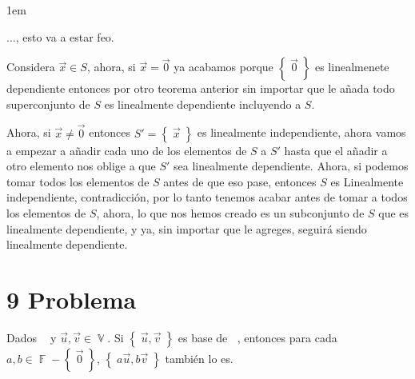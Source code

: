 \documentclass[12pt, fleqn]{article}                             %
\newenvironment{SmallIndentation}[1][0.75em]                    %
        {\begin{adjustwidth}{#1}{}\begin{footnotesize}}             %
        {\end{footnotesize}\end{adjustwidth}}                       %
\theoremstyle{break}                                            %
\DeclareMathOperator \GenericField {\mathbb{F}}                 %
\DeclareMathOperator \VectorSet    {\mathbb{V}}                 %
\DeclareMathOperator \VectorSpace  {\VectorSet_{\GenericField}} %
\newcommand{\Set}[1]    {\left\{ \; #1 \; \right\}}             %
\begin{document}
\begin{itemize}
\begin{SmallIndentation}[1em]
                $\dots$, esto va a estar feo.

                Considera $\vec x \in S$, ahora, si $\vec x = \vec 0$ ya acabamos porque $\Set{\vec 0}$ es linealmenete dependiente
                entonces por otro teorema anterior sin importar que le añada todo superconjunto de $S$ es linealmente dependiente
                incluyendo a $S$.

                Ahora, si $\vec x \neq \vec 0$ entonces $S' = \Set{\vec x}$ es linealmente independiente, ahora vamos a empezar
                a añadir cada uno de los elementos de $S$ a $S'$ hasta que el añadir a otro elemento nos oblige a que $S'$ 
                sea linealmente dependiente. Ahora, si podemos tomar todos los elementos de $S$ antes de que eso pase, entonces
                $S$ es Linealmente independiente, contradicción, por lo tanto tenemos acabar antes de tomar a todos los elementos
                de $S$, ahora, lo que nos hemos creado es un subconjunto de $S$ que es linealmente dependiente, y ya, sin importar
                que le agreges, seguirá siendo linealmente dependiente.
            
            \end{SmallIndentation}

    \end{itemize}



\clearpage
\section{9 Problema}

    Dados $\VectorSpace$ y $\vec u, \vec v \in \VectorSet$. Si $\Set{ \vec u, \vec v}$
    es base de $\VectorSpace$, entonces para cada $a, b \in \GenericField - \Set{\vec 0}$, $\Set{a\vec u, b \vec v}$
    también lo es.
\end{document}
